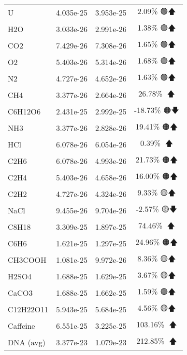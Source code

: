 \begin{longtable}{|l|c|c|c|}
U & 4.035e-25 & 3.953e-25 & 2.09\% 🟢🡅 \\
H2O & 3.033e-26 & 2.991e-26 & 1.38\% 🟢🡅 \\
CO2 & 7.429e-26 & 7.308e-26 & 1.65\% 🟢🡅 \\
O2 & 5.403e-26 & 5.314e-26 & 1.68\% 🟢🡅 \\
N2 & 4.727e-26 & 4.652e-26 & 1.63\% 🟢🡅 \\
CH4 & 3.377e-26 & 2.664e-26 & 26.78\% 🔴🡅 \\
C6H12O6 & 2.431e-25 & 2.992e-25 & -18.73\% 🟠🡇 \\
NH3 & 3.377e-26 & 2.828e-26 & 19.41\% 🟠🡅 \\
HCl & 6.078e-26 & 6.054e-26 & 0.39\% 🩷🡅 \\
C2H6 & 6.078e-26 & 4.993e-26 & 21.73\% 🟠🡅 \\
C2H4 & 5.403e-26 & 4.658e-26 & 16.00\% 🟠🡅 \\
C2H2 & 4.727e-26 & 4.324e-26 & 9.33\% 🟡🡅 \\
NaCl & 9.455e-26 & 9.704e-26 & -2.57\% 🟡🡇 \\
C8H18 & 3.309e-25 & 1.897e-25 & 74.46\% 🔴🡅 \\
C6H6 & 1.621e-25 & 1.297e-25 & 24.96\% 🟠🡅 \\
CH3COOH & 1.081e-25 & 9.972e-26 & 8.36\% 🟡🡅 \\
H2SO4 & 1.688e-25 & 1.629e-25 & 3.67\% 🟡🡅 \\
CaCO3 & 1.688e-25 & 1.662e-25 & 1.59\% 🟢🡅 \\
C12H22O11 & 5.943e-25 & 5.684e-25 & 4.56\% 🟡🡅 \\
Caffeine & 6.551e-25 & 3.225e-25 & 103.16\% 🔴🡅 \\
DNA (avg) & 3.377e-23 & 1.079e-23 & 212.85\% 🔴🡅 \\
\end{longtable}
